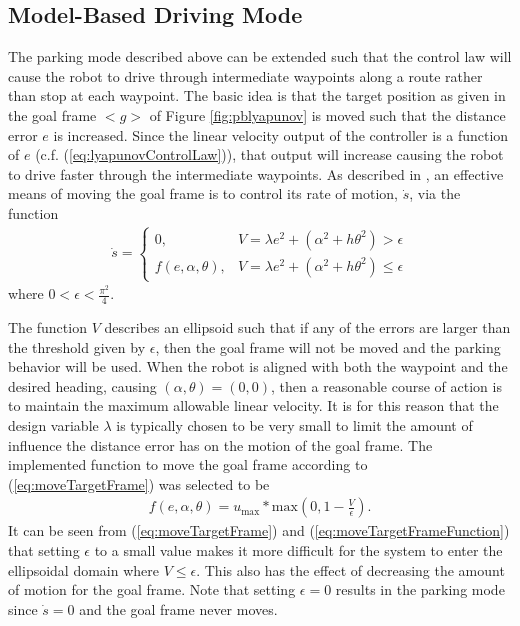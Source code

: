 \subsection{Model-Based Driving Mode}
\label{sec:drivingMode}
The parking mode described above can be extended such that the control law will cause the robot to drive through intermediate waypoints along a route rather than stop at each waypoint. The basic idea is that the target position as given in the goal frame $<g>$ of Figure \ref{fig:pblyapunov} is moved such that the distance error $e$ is increased. Since the linear velocity output of the controller is a function of $e$ (c.f. (\ref{eq:lyapunovControlLaw})), that output will increase causing the robot to drive faster through the intermediate waypoints. As described in \cite{Aicardi_UnicycleLyapunov95}, an effective means of moving the goal frame is to control its rate of motion, $\dot{s}$, via the function
\begin{align}
\label{eq:moveTargetFrame}
\dot{s} =
\begin{cases}
0, & V = \lambda e^2 + (\alpha^2+h\theta^2) > \epsilon \\
f(e,\alpha,\theta), & V = \lambda e^2 + (\alpha^2+h\theta^2) \leq \epsilon
\end{cases}
\end{align}
where $0<\epsilon<\frac{\pi^2}{4}$.

The function $V$ describes an ellipsoid such that if any of the errors are larger than the threshold given by $\epsilon$, then the goal frame will not be moved and the parking behavior will be used. When the robot is aligned with both the waypoint and the desired heading, causing $(\alpha,\theta)=(0,0)$, then a reasonable course of action is to maintain the maximum allowable linear velocity. It is for this reason that the design variable $\lambda$ is typically chosen to be very small to limit the amount of influence the distance error has on the motion of the goal frame. The implemented function to move the goal frame according to (\ref{eq:moveTargetFrame}) was selected to be
\begin{align}
\label{eq:moveTargetFrameFunction}
f(e,\alpha,\theta) = u_{\text{max}} * \text{max}\left(0, 1 - \frac{V}{\epsilon}\right).
\end{align}
It can be seen from (\ref{eq:moveTargetFrame}) and (\ref{eq:moveTargetFrameFunction}) that setting $\epsilon$ to a small value makes it more difficult for the system to enter the ellipsoidal domain where $V\leq\epsilon$. This also has the effect of decreasing the amount of motion for the goal frame. Note that setting $\epsilon=0$ results in the parking mode since $\dot{s}=0$ and the goal frame never moves.

